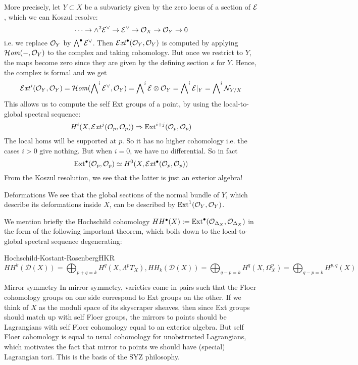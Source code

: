 More precisely, let $Y\subset X$ be a subvariety given by the zero locus of a section of $\mathcal{E}$, which we can Koszul resolve:
\begin{equation*}
    \cdots\to\wedge^2\mathcal{E}^\vee\to\mathcal{E}^\vee\to\mathcal{O}_X\to\mathcal{O}_{Y}\to0
\end{equation*}
i.e. we replace $\mathcal{O}_Y$ by $\bigwedge^\bullet\mathcal{E}^\vee$. Then $\operatorname{\mathcal{E}\mathit{xt}}^\bullet(\mathcal{O}_Y,\mathcal{O}_Y)$ is computed by applying $\operatorname{\mathcal{H}\mathit{om}}(-,\mathcal{O}_Y)$ to the complex and taking cohomology. But once we restrict to $Y$, the maps become zero since they are given by the defining section $s$ for $Y$. Hence, the complex is formal and we get
\begin{equation*}
    \operatorname{\mathcal{E}\mathit{xt}}^i(\mathcal{O}_Y,\mathcal{O}_Y)
        = \operatorname{\mathcal{H}\mathit{om}}(\bigwedge\nolimits^i\mathcal{E}^\vee,\mathcal{O}_Y)
        = \bigwedge\nolimits^i\mathcal{E}\otimes\mathcal{O}_Y
        = \bigwedge\nolimits^i\mathcal{E}|_Y
        = \bigwedge\nolimits^i\mathcal{N}_{Y/X}
\end{equation*}
This allows us to compute the self Ext groups of a point, by using the local-to-global spectral sequence:
\begin{equation*}
    H^i(X,\operatorname{\mathcal{E}\mathit{xt}}^j(\mathcal{O}_p,\mathcal{O}_p)) \Rightarrow \operatorname{Ext}^{i+j}(\mathcal{O}_p,\mathcal{O}_p)
\end{equation*}
The local homs will be supported at $p$. So it has no higher cohomology i.e. the cases $i>0$ give nothing. But when $i=0$, we have no differential. So in fact
\begin{equation*}
    \operatorname{Ext}^\bullet(\mathcal{O}_p,\mathcal{O}_p) \simeq H^0(X,\operatorname{\mathcal{E}\mathit{xt}}^\bullet(\mathcal{O}_p,\mathcal{O}_p))
\end{equation*}
From the Koszul resolution, we see that the latter is just an exterior algebra!

\begin{remark}{Deformations}{}
    We see that the global sections of the normal bundle of $Y$, which describe its deformations inside $X$, can be described by $\operatorname{Ext}^1(\mathcal{O}_Y,\mathcal{O}_Y)$.
\end{remark}
We mention briefly the Hochschild cohomology $HH^\bullet(X):=\operatorname{Ext}^\bullet(\mathcal{O}_{\Delta_X}, \mathcal{O}_{\Delta_X})$ in the form of the following important theorem, which boils down to the local-to-global spectral sequence degenerating:
\begin{theorem}{Hochschild-Kostant-Rosenberg}{HKR}
    $$HH^k(\mathcal{D}(X))=\bigoplus_{p+q=k} H^q(X, \Lambda^p T_X), HH_k(\mathcal{D}(X))=\bigoplus_{q-p=k} H^q(X, \Omega^p_X)=\bigoplus_{q-p=k} H^{p,q}(X)$$
    
\end{theorem}

\begin{remark}{Mirror symmetry}{}
    In mirror symmetry, varieties come in pairs such that the Floer cohomology groups on one side correspond to Ext groups on the other. If we think of $X$ as the moduli space of its skyscraper sheaves, then since Ext groups should match up with self Floer groups, the mirrors to points should be Lagrangians with self Floer cohomology equal to an exterior algebra. But self Floer cohomology is equal to usual cohomology for unobstructed Lagrangians, which motivates the fact that mirror to points we should have (special) Lagrangian tori. This is the basis of the SYZ philosophy.
\end{remark}

